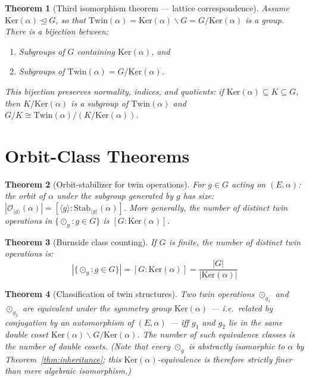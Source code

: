 \documentclass[12pt]{article}
\theoremstyle{plain}
\newtheorem{theorem}{Theorem}[section]
\theoremstyle{definition}
\theoremstyle{remark}
\newcommand{\Ker}{\mathrm{Ker}}
\newcommand{\Stab}{\mathrm{Stab}}
\newcommand{\Twin}{\mathrm{Twin}}
\begin{document}
\begin{theorem}[Third isomorphism theorem --- lattice correspondence]\label{thm:iso3}
Assume $\Ker(\alpha) \trianglelefteq G$, so that $\Twin(\alpha) = \Ker(\alpha)\backslash G = G/\Ker(\alpha)$ is a group. There is a bijection between:
\begin{enumerate}[label=(\roman*)]
    \item Subgroups of $G$ containing $\Ker(\alpha)$, and
    \item Subgroups of $\Twin(\alpha) = G/\Ker(\alpha)$.
\end{enumerate}
This bijection preserves normality, indices, and quotients: if $\Ker(\alpha) \subseteq K \subseteq G$, then $K/\Ker(\alpha)$ is a subgroup of $\Twin(\alpha)$ and $G/K \cong \Twin(\alpha)/(K/\Ker(\alpha))$.
\end{theorem}


\section{Orbit-Class Theorems}
\label{sec:classes}

\begin{theorem}[Orbit-stabilizer for twin operations]\label{thm:orbit-stab}
For $g \in G$ acting on $(E, \alpha)$: the orbit of $\alpha$ under the subgroup generated by $g$ has size:
$|\mathcal{O}_{\langle g \rangle}(\alpha)| = [\langle g \rangle : \Stab_{\langle g \rangle}(\alpha)]$.
More generally, the number of distinct twin operations in $\{\odot_g : g \in G\}$ is $[G : \Ker(\alpha)]$.
\end{theorem}

\begin{theorem}[Burnside class counting]\label{thm:burnside}
If $G$ is finite, the number of distinct twin operations is:
\begin{equation}
|\{\odot_g : g \in G\}| = [G : \Ker(\alpha)] = \frac{|G|}{|\Ker(\alpha)|}
\end{equation}
\end{theorem}

\begin{theorem}[Classification of twin structures]\label{thm:classification}
Two twin operations $\odot_{g_1}$ and $\odot_{g_2}$ are \emph{equivalent under the symmetry group} $\Ker(\alpha)$ --- i.e.\ related by conjugation by an automorphism of $(E,\alpha)$ --- iff $g_1$ and $g_2$ lie in the same double coset $\Ker(\alpha) \backslash G / \Ker(\alpha)$. The number of such equivalence classes is the number of double cosets. (Note that \emph{every} $\odot_g$ is abstractly isomorphic to $\alpha$ by Theorem~\ref{thm:inheritance}; this $\Ker(\alpha)$-equivalence is therefore strictly finer than mere algebraic isomorphism.)
\end{theorem}
\end{document}
